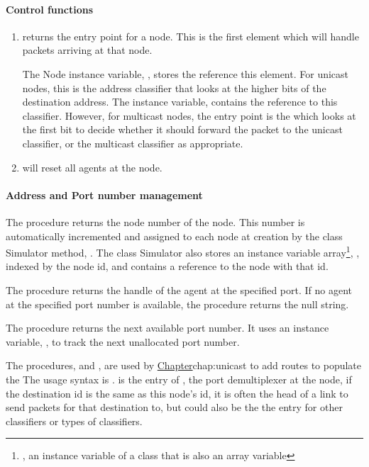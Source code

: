 \paragraph{Control functions}
\begin{enumerate}
\item {} %
returns the entry point for a node.
This is the first element which will handle packets arriving at that node.

The Node instance variable, , stores the reference this element.
For unicast nodes, this is the address classifier that looks at the higher
bits of the destination address.
The instance variable,  contains the reference to this
classifier.
However, for multicast nodes, the entry point is the
 which looks at the first bit to decide whether
it should forward the packet to the unicast classifier, or the multicast
classifier as appropriate.

\item {} %
will reset all agents at the node.
\end{enumerate}


\paragraph{Address and Port number management}
The procedure  %
returns the node number of the node.
This number is automatically incremented and assigned to each node at
creation by the class Simulator method, .%
The class Simulator also stores an instance variable array\footnote{%
  \ie, an instance variable of a class that is also an array variable},
  , indexed by the node id, and contains a reference to the
  node with that id.

The procedure  %
returns the handle of the
agent at the specified port.
If no agent at the specified port number is available, the procedure returns
the null string.

The procedure  returns the next available port number.
It uses an instance variable, ,
to track the next unallocated port number.

The procedures,  and ,
are used by \href{unicast routing}{Chapter}{chap:unicast}
to add routes to populate the 
The usage syntax is
. %
 is the entry of , the port demultiplexer
at the node, if the destination id is the same as this node's id,
it is often the head of a link to send packets for that destination to,
but could also be the the entry for other classifiers or types of classifiers.

